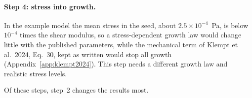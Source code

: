 \paragraph{Step 4: stress into growth.} In the example model the mean stress
in the seed, about $2.5\times10^{-4}$~Pa, is below $10^{-4}$ times the shear
modulus, so a stress-dependent
growth law would change little with the published parameters, while the
mechanical term of Klempt et al.\ 2024, Eq.~30, kept as written would stop all
growth (Appendix~\ref{app:klempt2024}). This step needs a different growth law
and realistic stress levels.

Of these steps, step~2 changes the results most.
\fi
